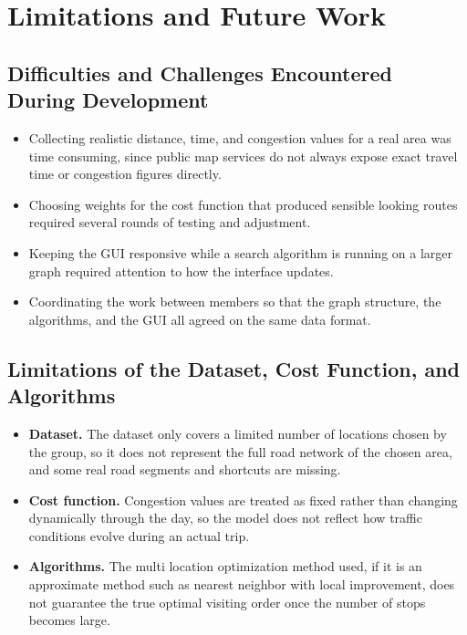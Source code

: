 \chapter{Limitations and Future Work}
\label{chap:limitations}

\section{Difficulties and Challenges Encountered During Development}


\begin{itemize}[itemsep=2pt]
  \item Collecting realistic distance, time, and congestion values for a real area was time consuming, since public map services do not always expose exact travel time or congestion figures directly.
  \item Choosing weights for the cost function that produced sensible looking routes required several rounds of testing and adjustment.
  \item Keeping the GUI responsive while a search algorithm is running on a larger graph required attention to how the interface updates.
  \item Coordinating the work between members so that the graph structure, the algorithms, and the GUI all agreed on the same data format.
\end{itemize}

\section{Limitations of the Dataset, Cost Function, and Algorithms}

\begin{itemize}[itemsep=2pt]
  \item \textbf{Dataset.} The dataset only covers a limited number of locations chosen by the group, so it does not represent the full road network of the chosen area, and some real road segments and shortcuts are missing.
  \item \textbf{Cost function.} Congestion values are treated as fixed rather than changing dynamically through the day, so the model does not reflect how traffic conditions evolve during an actual trip. 
  \item \textbf{Algorithms.} The multi location optimization method used, if it is an approximate method such as nearest neighbor with local improvement, does not guarantee the true optimal visiting order once the number of stops becomes large. 
\end{itemize}

